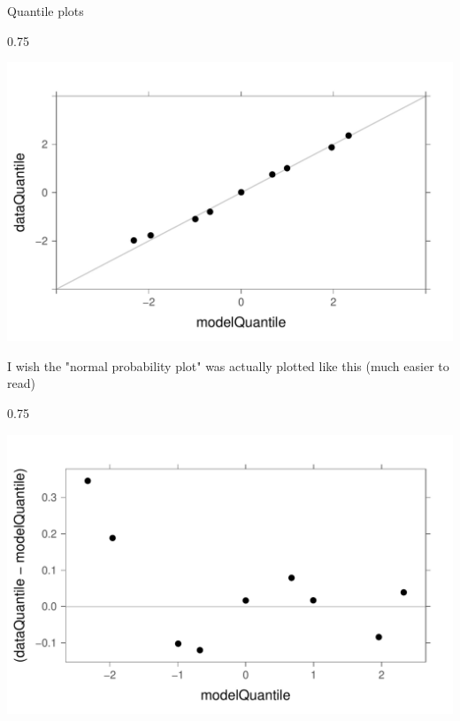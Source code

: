 \documentclass{beamer}\usepackage[]{graphicx}\usepackage[]{color}
\newenvironment{knitrout}{}{} %
\renewenvironment{knitrout}{\begin{spacing}{0.75}\begin{tiny}}{\end{tiny}\end{spacing}}
\begin{document}
\begin{frame}{Quantile plots}

\begin{knitrout}\small
{}\color{fgcolor}

{\centering \includegraphics[width=0.89\linewidth]{figure/graphics-unnamed-chunk-23-1} 

}



\end{knitrout}
\newpage

I wish the "normal probability plot" was actually plotted like this
(much easier to read)
\begin{knitrout}\small
{}\color{fgcolor}

{\centering \includegraphics[width=0.89\linewidth]{figure/graphics-unnamed-chunk-24-1} 

}



\end{knitrout}
\newpage


\end{frame}
\end{document}
